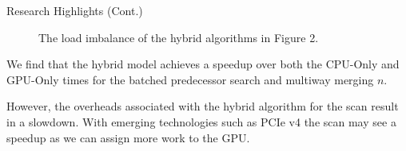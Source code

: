 \documentclass[final]{beamer}
\newlength{\colwidth}
\begin{document}
\begin{frame}[t]
\begin{columns}[t]
\begin{column}{\colwidth}
\begin{block}{Research Highlights (Cont.)}
\begin{figure}[t]
\centering
{}
    \caption{The load imbalance of the hybrid algorithms in Figure 2.}
   \label{fig:scan_results}
\end{figure}

\end{block} 
\begin{description}[font=$\bullet$~\normalfont\scshape\color{red!50!black}]
\item We find that the hybrid model achieves a speedup over both the CPU-Only and GPU-Only times for the batched predecessor search and multiway merging $n$. 
\item However, the overheads associated with the hybrid algorithm for the scan result in a slowdown. With emerging technologies such as PCIe v4 the scan may see
  a speedup as we can assign more work to the GPU.
\end{description}



\end{column}
\end{columns}
\end{frame}
\end{document}

